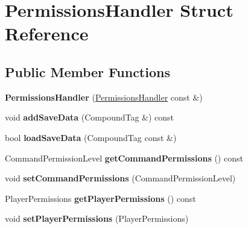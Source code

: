 \hypertarget{struct_permissions_handler}{}\section{Permissions\+Handler Struct Reference}
\label{struct_permissions_handler}
\subsection*{Public Member Functions}
\begin{DoxyCompactItemize}
\item 
\mbox{\label{struct_permissions_handler_a2578904ab1ea6570ff62f4b06f612f8d}} 
{\bfseries Permissions\+Handler} (\mbox{\hyperlink{struct_permissions_handler}{Permissions\+Handler}} const \&)
\item 
\mbox{\label{struct_permissions_handler_a5cdd45da5a66cdcc220be168b0179874}} 
void {\bfseries add\+Save\+Data} (Compound\+Tag \&) const
\item 
\mbox{\label{struct_permissions_handler_a83c6fcb04f5e5fd76b584a55feb475e9}} 
bool {\bfseries load\+Save\+Data} (Compound\+Tag const \&)
\item 
\mbox{\label{struct_permissions_handler_ad46a3bfda5f9492d442f6c8e4ec6cff5}} 
Command\+Permission\+Level {\bfseries get\+Command\+Permissions} () const
\item 
\mbox{\label{struct_permissions_handler_ad3e59cb13e57253866bb262298dcc888}} 
void {\bfseries set\+Command\+Permissions} (Command\+Permission\+Level)
\item 
\mbox{\label{struct_permissions_handler_a41c084899d0f31e912d3f1991ac1588e}} 
Player\+Permissions {\bfseries get\+Player\+Permissions} () const
\item 
\mbox{\label{struct_permissions_handler_acf327ef5bc9c2fdbc64aef6671b08727}} 
void {\bfseries set\+Player\+Permissions} (Player\+Permissions)
\end{DoxyCompactItemize}
